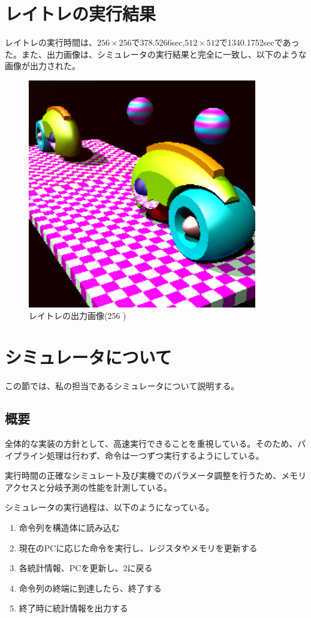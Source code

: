 \documentclass[a4paper,11pt]{ltjsarticle}
\begin{document}
\section{レイトレの実行結果}
レイトレの実行時間は、$256 \times 256$で378.5266sec,$512 \times 512$で1340.1752secであった。また、出力画像は、シミュレータの実行結果と完全に一致し、以下のような画像が出力された。

\begin{figure}[H]
  \begin{center}
    \includegraphics[width=10cm]{out.png}
  \end{center}
  \caption{レイトレの出力画像(256 )}
\end{figure}

\section{シミュレータについて}
この節では、私の担当であるシミュレータについて説明する。
\subsection*{概要}
全体的な実装の方針として、高速実行できることを重視している。そのため、パイプライン処理は行わず、命令は一つずつ実行するようにしている。

実行時間の正確なシミュレート及び実機でのパラメータ調整を行うため、メモリアクセスと分岐予測の性能を計測している。

シミュレータの実行過程は、以下のようになっている。

\begin{enumerate}
  \item 命令列を構造体に読み込む
  \item 現在のPCに応じた命令を実行し、レジスタやメモリを更新する
  \item 各統計情報、PCを更新し、2に戻る
  \item 命令列の終端に到達したら、終了する
  \item 終了時に統計情報を出力する
\end{enumerate}
\end{document}
